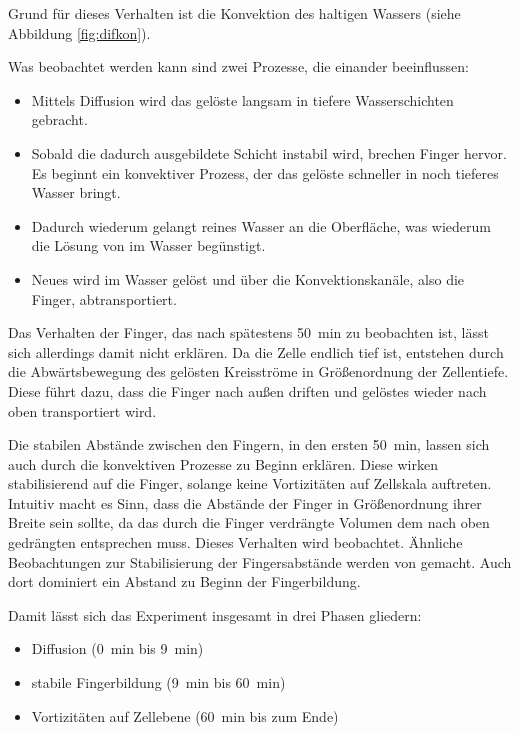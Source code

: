 Grund für dieses Verhalten ist die Konvektion des \COTm haltigen Wassers (siehe Abbildung \ref{fig:difkon}). 

Was beobachtet werden kann sind zwei Prozesse, die einander beeinflussen: 
\begin{itemize}
 \item Mittels Diffusion wird das gelöste \COT langsam in tiefere Wasserschichten gebracht.
 \item Sobald die dadurch ausgebildete Schicht instabil wird, brechen Finger hervor. Es beginnt ein konvektiver Prozess, der das gelöste \COT schneller in noch tieferes Wasser bringt.
 \item Dadurch wiederum gelangt reines Wasser an die Oberfläche, was wiederum die Lösung von \COT im Wasser begünstigt.
 \item Neues \COT wird im Wasser gelöst und über die Konvektionskanäle, also die Finger, abtransportiert.
\end{itemize}

Das Verhalten der Finger, das nach spätestens \SI{50}{\minute} zu beobachten ist, lässt sich allerdings damit nicht erklären. Da die Zelle endlich tief ist, entstehen durch die Abwärtsbewegung des gelösten \COT Kreisströme in Größenordnung der Zellentiefe. Diese führt dazu, dass die Finger nach außen driften und gelöstes \COT wieder nach oben transportiert wird.
 
Die stabilen Abstände zwischen den Fingern, in den ersten \SI{50}{\minute}, lassen sich auch durch die konvektiven Prozesse zu Beginn erklären. Diese wirken stabilisierend auf die Finger, solange keine Vortizitäten auf Zellskala auftreten.
Intuitiv macht es Sinn, dass die Abstände der Finger in Größenordnung ihrer Breite sein sollte, da das durch die Finger verdrängte Volumen dem nach oben gedrängten entsprechen muss. Dieses Verhalten wird beobachtet.
Ähnliche Beobachtungen zur Stabilisierung der Fingersabstände werden von \cite{fernandez} gemacht. Auch dort dominiert ein Abstand zu Beginn der Fingerbildung. 

Damit lässt sich das Experiment insgesamt in drei Phasen gliedern:
\begin{itemize}
 \item Diffusion (\SI{0}{\minute} bis \SI{9}{\minute})
 \item stabile Fingerbildung (\SI{9}{\minute} bis \SI{60}{\minute})
 \item Vortizitäten auf Zellebene (\SI{60}{\minute} bis zum Ende) 
\end{itemize}


